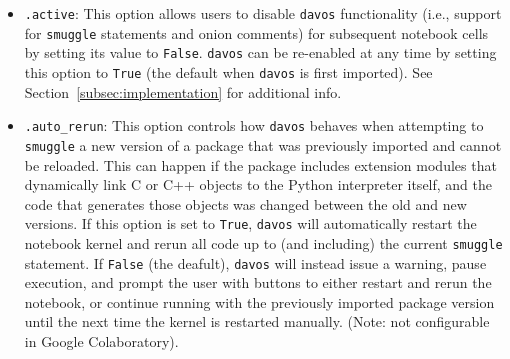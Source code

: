 \documentclass[preprint,12pt,a4paper]{elsarticle}
\begin{document}
\begin{itemize}
\item \texttt{.active}: This option allows users to disable \texttt{davos} functionality (i.e., support for \texttt{smuggle} statements and onion comments) for subsequent notebook cells by setting its value to \texttt{False}. \texttt{davos} can be re-enabled at any time by setting this option to \texttt{True} (the default when \texttt{davos} is first imported). See Section~\ref{subsec:implementation} for additional info.
\item \texttt{.auto\_rerun}: This option controls how \texttt{davos} behaves when attempting to \texttt{smuggle} a new version of a package that was previously imported and cannot be reloaded. This can happen if the package includes extension modules that dynamically link C or C++ objects to the Python interpreter itself, and the code that generates those objects was changed between the old and new versions. If this option is set to \texttt{True}, \texttt{davos} will automatically restart the notebook kernel and rerun all code up to (and including) the current \texttt{smuggle} statement. If \texttt{False} (the deafult), \texttt{davos} will instead issue a warning, pause execution, and prompt the user with buttons to either restart and rerun the notebook, or continue running with the previously imported package version until the next time the kernel is restarted manually. (Note: not configurable in Google Colaboratory).

\end{itemize}
\end{document}
